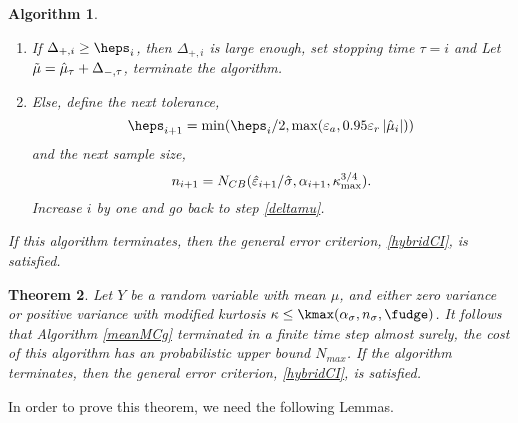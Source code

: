 \documentclass{iitthesis}
\newtheorem{theorem}{Theorem}[section]
\newtheorem{algorithm}[theorem]{Algorithm}
\begin{document}
\begin{algorithm}
\begin{enumerate}
\begin{enumerate}
\item If $\Delta_{+,i} \geq  \heps_i$, then $\Delta_{+,i}$ is large enough, set stopping time $\tau = i$ and Let $\tilde{\mu} = \hat{\mu}_{\tau}+\Delta_{-, \tau}$, terminate the algorithm.
\item Else, define the next tolerance, $$\heps_{i+1} = \min(\heps_i/2, \max(\varepsilon_a,0.95\varepsilon_r\abs{\hmu_i}))$$ and the next sample size, $$n_{i+1} = N_{CB}(\hat{\varepsilon}_{i+1}/\hat{\sigma},\alpha_{i+1},\kappa_{\max}^{3/4}).$$ Increase $i$ by one and go back to step \ref{deltamu}. 
\end{enumerate}
\end{enumerate}
If this algorithm terminates, then the general error criterion, \eqref{hybridCI}, is satisfied.
\end{algorithm}

\begin{theorem}\label{hybriderrthm}
Let $Y$ be a random variable with mean $\mu$, and either zero variance or positive variance with modified kurtosis $\kappa \leq \kmax(\alpha_\sigma, n_\sigma, \fudge)$. It follows that Algorithm \ref{meanMCg} terminated in a finite time step almost surely, the cost of this algorithm has an probabilistic upper bound $N_{max}$. If the algorithm terminates, then the general error criterion, \eqref{hybridCI}, is satisfied.
\end{theorem}
In order to prove this theorem, we need the following Lemmas.
\end{document}
